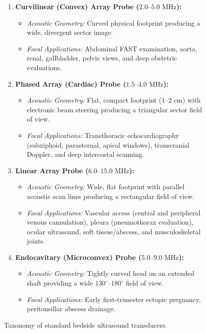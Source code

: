 \documentclass[11pt,a4paper]{article}
\begin{document}
\begin{figure}[htbp]
\centering
\begin{tcolorbox}[colback=teal!5!white,colframe=teal!60!black,title=\textbf{Standard POCUS Transducer Typology and Clinical Indications},width=\linewidth]
\small
\begin{enumerate}[leftmargin=1.5em]
    \item \textbf{Curvilinear (Convex) Array Probe ($2.0\text{--}5.0\text{ MHz}$):}
    \begin{itemize}
        \item \textit{Acoustic Geometry:} Curved physical footprint producing a wide, divergent sector image.
        \item \textit{Focal Applications:} Abdominal FAST examination, aorta, renal, gallbladder, pelvic views, and deep obstetric evaluations.
    \end{itemize}
    \item \textbf{Phased Array (Cardiac) Probe ($1.5\text{--}4.0\text{ MHz}$):}
    \begin{itemize}
        \item \textit{Acoustic Geometry:} Flat, compact footprint ($1\text{--}2\text{ cm}$) with electronic beam steering producing a triangular sector field of view.
        \item \textit{Focal Applications:} Transthoracic echocardiography (subxiphoid, parasternal, apical windows), transcranial Doppler, and deep intercostal scanning.
    \end{itemize}
    \item \textbf{Linear Array Probe ($6.0\text{--}15.0\text{ MHz}$):}
    \begin{itemize}
        \item \textit{Acoustic Geometry:} Wide, flat footprint with parallel acoustic scan lines producing a rectangular field of view.
        \item \textit{Focal Applications:} Vascular access (central and peripheral venous cannulation), pleura (pneumothorax evaluation), ocular ultrasound, soft tissue/abscess, and musculoskeletal joints.
    \end{itemize}
    \item \textbf{Endocavitary (Microconvex) Probe ($5.0\text{--}9.0\text{ MHz}$):}
    \begin{itemize}
        \item \textit{Acoustic Geometry:} Tightly curved head on an extended shaft providing a wide $130^\circ\text{--}180^\circ$ field of view.
        \item \textit{Focal Applications:} Early first-trimester ectopic pregnancy, peritonsillar abscess drainage.
    \end{itemize}
\end{enumerate}
\end{tcolorbox}
\caption{Taxonomy of standard bedside ultrasound transducers.}
\label{fig:transducers}
\end{figure}
\end{document}
